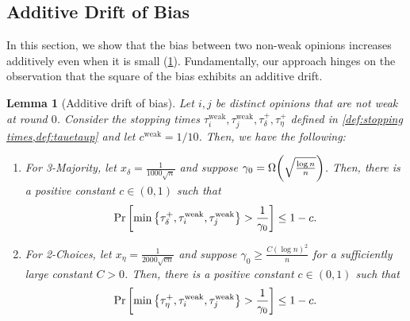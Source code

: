 \documentclass[letterpaper,11pt]{article}
\newtheorem{lemma}[theorem]{Lemma}
\newcommand{\e}{\mathrm{e}}
\newcommand{\alphanorm}{\gamma}
\newcommand{\taudeltaplus}{\tau^{+}_\delta}
\newcommand{\tauetaplus}{\tau^{+}_\eta}
\newcommand{\cweak}{c^{\mathrm{weak}}}
\newcommand{\cdeltaplus}{c^{+}_\delta}
\newcommand{\tauiweak}{\tau^{\mathrm{weak}}_i}
\newcommand{\taujweak}{\tau^{\mathrm{weak}}_j}
\newcommand{\xdelta}{x_{\delta}}
\newcommand{\xeta}{x_{\eta}}
\newcommand{\Cnorminitial}{C_{\alphanorm}}
\begin{document}
\subsection{Additive Drift of Bias}\label{sec:additive drift of bias}
In this section, we show that the bias between two non-weak opinions increases additively even when it is small (\cref{lem:additive drift}).
Fundamentally, our approach hinges on the observation that the square of the bias exhibits an additive drift.

\begin{lemma}[Additive drift of bias] \label{lem:additive drift}
  Let $ i,j $ be distinct opinions that are not weak at round $ 0 $.
  Consider the stopping times $\tauiweak,\taujweak, \taudeltaplus, \tauetaplus $ defined in \cref{def:stopping times,def:tauetaup} and let $\cweak=1/10$.
  Then, we have the following:
\begin{enumerate}
  \renewcommand{\labelenumi}{(\roman{enumi})}
  \item For 3-Majority, 
  let $\xdelta=\frac{1}{1000\sqrt{n}}$ and 
  suppose $\alphanorm_0=\Omega\qty(\sqrt{\frac{\log n}{n}})$.
  Then, there is a positive constant $c \in (0,1)$ such that
  \begin{align*} 
    \Pr\qty[ \min\qty{ \taudeltaplus,\tauiweak,\taujweak } > \frac{1}{\alphanorm_0}] \le 1-c.
  \end{align*}
  \item For 2-Choices, 
  let 
  $\xeta=\frac{1}{2000\sqrt{\e n}}$ and 
  suppose $\alphanorm_0\geq \frac{C(\log n)^2}{n}$ for a sufficiently large constant $C>0$.
  Then, there is a  positive constant $c \in (0,1)$ such that
  \begin{align*} 
    \Pr\qty[ \min\qty{ \tauetaplus,\tauiweak,\taujweak} > \frac{1}{\alphanorm_0} ] \le 1-c.
  \end{align*}
  \end{enumerate}
\end{lemma}
\end{document}
